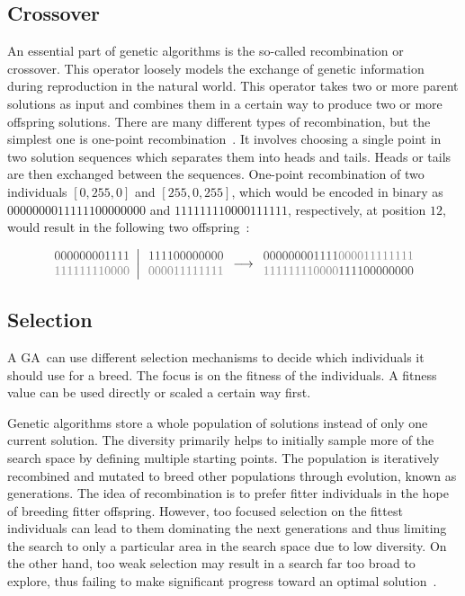 \documentclass[paper=a4,%
  twoside,%
  BCOR4mm,%
  abstract=true,%
  toc=bibliography,%
  chapterprefix=true,%
  toc=bibliographynumbered,%
  open=right,%
  english,%
  pagesize=pdftex]{scrreprt}
\begin{document}
\subsection{Crossover}
\label{sec:background-crossover}
An essential part of genetic algorithms is the so-called recombination or crossover. This operator loosely models the exchange of genetic information during reproduction in the natural world. This operator takes two or more parent solutions as input and combines them in a certain way to produce two or more offspring solutions. There are many different types of recombination, but the simplest one is one-point recombination~\cite{McMinn_2004}. It involves choosing a single point in two solution sequences which separates them into heads and tails. Heads or tails are then exchanged between the  sequences. One-point recombination of two individuals $[0, 255, 0]$ and $[255, 0, 255]$, which would be encoded in binary as $0000000011111100000000$ and $111111110000111111$, respectively, at position $12$, would result in the following two offspring~\cite{McMinn_2004}:

\[
\left.\begin{array}{c}
\textcolor{webgreen}{000000001111} \\  %
\textcolor{thesisblue}{111111110000} %
\end{array}\right|
\begin{array}{c}
\textcolor{webgreen}{111100000000} \\  %
\textcolor{thesisblue}{000011111111} %
\end{array} \longrightarrow
\begin{array}{c}
\textcolor{webgreen}{000000001111}\textcolor{thesisblue}{000011111111} \\  %
\textcolor{thesisblue}{111111110000}\textcolor{webgreen}{111100000000} %
\end{array}
\]


\subsection{Selection}
A \ac{GA} can use different selection mechanisms to decide which individuals it should use for a breed. The focus is on the fitness of the individuals. A fitness value can be used directly or scaled a certain way first.

Genetic algorithms store a whole population of solutions instead of only one current solution. The diversity primarily helps to initially sample more of the search space by defining multiple starting points. The population is iteratively recombined and mutated to breed other populations through evolution, known as generations. The idea of recombination is to prefer fitter individuals in the hope of breeding fitter offspring. However, too focused selection on the fittest individuals can lead to them dominating the next generations and thus limiting the search to only a particular area in the search space due to low diversity. On the other hand, too weak selection may result in a search far too broad to explore, thus failing to make significant progress toward an optimal solution~\cite{McMinn_2004}.
\end{document}
